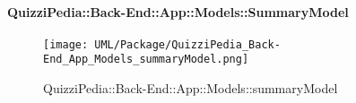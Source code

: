 \paragraph{QuizziPedia::Back-End::App::Models::SummaryModel}
\label{QuizziPedia::Back-End::App::Models::summaryModel}
\begin{figure}
	\centering
	\texttt{[image: UML/Package/QuizziPedia\_Back-End\_App\_Models\_summaryModel.png]}
	\caption{QuizziPedia::Back-End::App::Models::summaryModel}
\end{figure}
